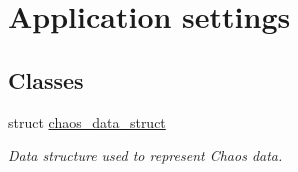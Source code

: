 \hypertarget{group__chaos-test-settings}{\section{Application settings}
\label{group__chaos-test-settings}
}
\subsection*{Classes}
\begin{DoxyCompactItemize}
\item 
struct \hyperlink{structchaos__data__struct}{chaos\-\_\-data\-\_\-struct}
\begin{DoxyCompactList}\small\item\em Data structure used to represent Chaos data. \end{DoxyCompactList}\end{DoxyCompactItemize}
